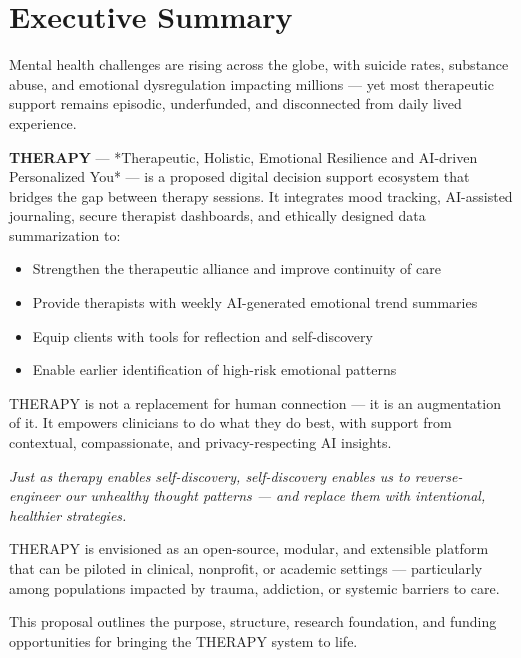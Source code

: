 \section*{Executive Summary}

Mental health challenges are rising across the globe, with suicide rates, substance abuse, and emotional dysregulation impacting millions\autocite{who_suicide_2025, who_substance_2022} — yet most therapeutic support remains episodic, underfunded, and disconnected from daily lived experience.

\textbf{THERAPY} — *Therapeutic, Holistic, Emotional Resilience and AI-driven Personalized You* — is a proposed digital decision support ecosystem that bridges the gap between therapy sessions. It integrates mood tracking, AI-assisted journaling, secure therapist dashboards, and ethically designed data summarization to:

\begin{itemize}
  \item Strengthen the therapeutic alliance and improve continuity of care
  \item Provide therapists with weekly AI-generated emotional trend summaries
  \item Equip clients with tools for reflection and self-discovery
  \item Enable earlier identification of high-risk emotional patterns
\end{itemize}

THERAPY is not a replacement for human connection — it is an augmentation of it. It empowers clinicians to do what they do best, with support from contextual, compassionate, and privacy-respecting AI insights.

\bigskip
\noindent\textit{
Just as therapy enables self-discovery, self-discovery enables us to reverse-engineer our unhealthy thought patterns — and replace them with intentional, healthier strategies.
}

\bigskip

THERAPY is envisioned as an open-source, modular, and extensible platform that can be piloted in clinical, nonprofit, or academic settings — particularly among populations impacted by trauma, addiction, or systemic barriers to care.

\bigskip

This proposal outlines the purpose, structure, research foundation, and funding opportunities for bringing the THERAPY system to life.
